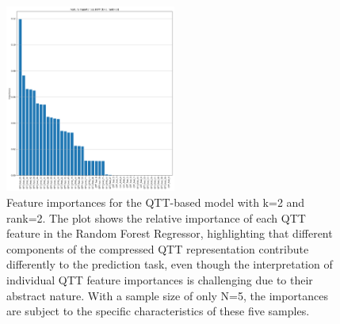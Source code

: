 \documentclass[twocolumn]{aastex631}
\begin{document}
\begin{figure}[h!]
    \centering
    \includegraphics[width=0.5\textwidth]{../input_files/plots/feature_importances_qtt_k2_r2_12_20250524-175150.png}
    \caption{Feature importances for the QTT-based model with k=2 and rank=2. The plot shows the relative importance of each QTT feature in the Random Forest Regressor, highlighting that different components of the compressed QTT representation contribute differently to the prediction task, even though the interpretation of individual QTT feature importances is challenging due to their abstract nature. With a sample size of only N=5, the importances are subject to the specific characteristics of these five samples.
}
    \label{fig:feature_importances_qtt_k2_r2}
\end{figure}
\end{document}
